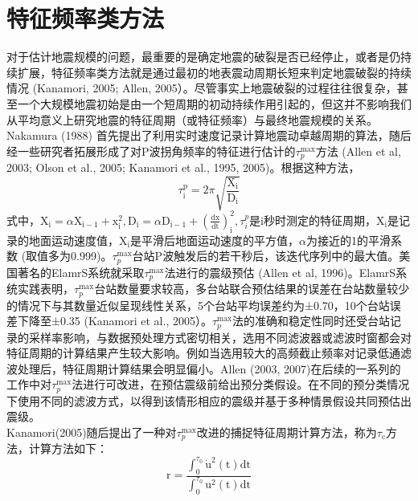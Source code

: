 \section{特征频率类方法}
\indent 对于估计地震规模的问题，最重要的是确定地震的破裂是否已经停止，或者是仍持续扩展，特征频率类方法就是通过最初的地表震动周期长短来判定地震破裂的持续情况 (Kanamori, 2005; Allen, 2005）。尽管事实上地震破裂的过程往往很复杂，甚至一个大规模地震初始是由一个短周期的初动持续作用引起的，但这并不影响我们从平均意义上研究地震的特征周期（或特征频率）与最终地震规模的关系。\\
\indent Nakamura (1988) 首先提出了利用实时速度记录计算地震动卓越周期的算法，随后经一些研究者拓展形成了对P波拐角频率的特征进行估计的$\tau_{p}^{\max }$方法 (Allen et al, 2003; Olson et al., 2005; Kanamori et al., 1995, 2005)。根据这种方法，\\
\begin{equation}
\tau_{\mathrm{i}}^{\mathrm{p}}=2 \pi \sqrt{\frac{\mathrm{X}_{\mathrm{i}}}{\mathrm{D}_{\mathrm{i}}}}
\end{equation}
式中，$\mathrm{X}_{\mathrm{i}}=\alpha \mathrm{X}_{\mathrm{i}-1}+\mathrm{x}_{\mathrm{i}}^{2}, \mathrm{D}_{\mathrm{i}}=\alpha \mathrm{D}_{\mathrm{i}-1}+\left(\frac{\mathrm{dx}}{\mathrm{dt}}\right)_{\mathrm{i}}^{2}, \tau_{i}^{p}$是i秒时测定的特征周期，$\mathrm{X}_{\mathrm{i}}$是记录的地面运动速度值，$\mathrm{X}_{\mathrm{i}}$是平滑后地面运动速度的平方值，$\alpha$为接近的1的平滑系数 (取值多为0.999)。$\tau_{p}^{\max}$台站P波触发后的若干秒后，该迭代序列中的最大值。美国著名的ElamrS系统就采取$\tau_{p}^{\max }$法进行的震级预估 (Allen et al, 1996)。ElamrS系统实践表明，$\tau_{p}^{\max}$台站数量要求较高，多台站联合预估结果的误差在台站数量较少的情况下与其数量近似呈现线性关系，5个台站平均误差约为±0.70，10个台站误差下降至±0.35 (Kanamori et al., 2005）。$\tau_{p}^{\max}$法的准确和稳定性同时还受台站记录的采样率影响，与数据预处理方式密切相关，选用不同滤波器或滤波时窗都会对特征周期的计算结果产生较大影响。例如当选用较大的高频截止频率对记录低通滤波处理后，特征周期计算结果会明显偏小。Allen (2003, 2007)在后续的一系列的工作中对$\tau_{p}^{\max}$法进行可改进，在预估震级前给出预分类假设。在不同的预分类情况下使用不同的滤波方式，以得到该情形相应的震级并基于多种情景假设共同预估出震级。\\
\indent Kanamori(2005)随后提出了一种对$\tau_{p}^{\max}$改进的捕捉特征周期计算方法，称为$\tau_{\mathrm{c}}$方法，计算方法如下：\\
\begin{equation}
\mathrm{r}=\frac{\int_{0}^{\tau_{0}} \dot{\mathrm{u}}^{2}(\mathrm{t}) \mathrm{dt}}{\int_{0}^{\tau_{0}} \mathrm{u}^{2}(\mathrm{t}) \mathrm{dt}}
\end{equation}
